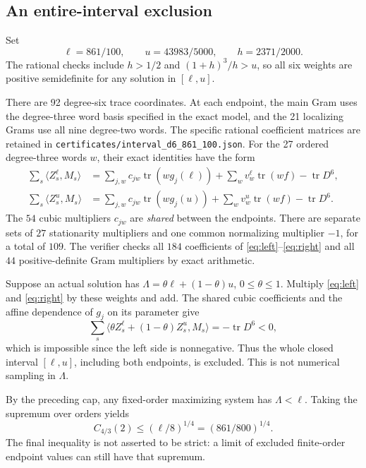 \documentclass[11pt]{article}
\newcommand{\tr}{\operatorname{tr}}
\theoremstyle{remark}\newtheorem{remark}[theorem]{Remark}
\begin{document}
\subsection{An entire-interval exclusion}
Set
\begin{equation}\label{eq:interval}
 \ell=861/100,\qquad u=43983/5000,\qquad h=2371/2000.
\end{equation}
The rational checks include \(h>1/2\) and \((1+h)^3/h>u\), so all six weights are positive semidefinite for any solution in \([\ell,u]\).

There are 92 degree-six trace coordinates. At each endpoint, the main Gram uses the degree-three word basis specified in the exact model, and the 21 localizing Grams use all nine degree-two words. The specific rational coefficient matrices are retained in
\texttt{certificates/interval\_d6\_861\_100.json}.
For the 27 ordered degree-three words \(w\), their exact identities have the form
\begin{align}
 \sum_s\langle Z_s^\ell,M_s\rangle
 &=\sum_{j,w}c_{jw}\tr(wg_j(\ell))
   +\sum_wv_w^\ell\tr(wf)-\tr D^6,
 \label{eq:left}\\
 \sum_s\langle Z_s^u,M_s\rangle
 &=\sum_{j,w}c_{jw}\tr(wg_j(u))
   +\sum_wv_w^u\tr(wf)-\tr D^6.
 \label{eq:right}
\end{align}
The \(54\) cubic multipliers \(c_{jw}\) are \emph{shared} between the endpoints. There are separate sets of \(27\) stationarity multipliers and one common normalizing multiplier \(-1\), for a total of \(109\). The verifier checks all \(184\) coefficients of \eqref{eq:left}--\eqref{eq:right} and all \(44\) positive-definite Gram multipliers by exact arithmetic.

Suppose an actual solution has \(\Lambda=\theta\ell+(1-\theta)u\), \(0\le\theta\le1\). Multiply \eqref{eq:left} and \eqref{eq:right} by these weights and add. The shared cubic coefficients and the affine dependence of \(g_j\) on its parameter give
\[
 \sum_s\langle\theta Z_s^\ell+(1-\theta)Z_s^u,M_s\rangle=-\tr D^6<0,
\]
which is impossible since the left side is nonnegative. Thus the whole closed interval \([\ell,u]\), including both endpoints, is excluded. This is not numerical sampling in \(\Lambda\).

By the preceding cap, any fixed-order maximizing system has \(\Lambda<\ell\). Taking the supremum over orders yields
\[
 C_{4/3}(2)\le(\ell/8)^{1/4}=(861/800)^{1/4}.
\]
The final inequality is not asserted to be strict: a limit of excluded finite-order endpoint values can still have that supremum.
\end{document}
